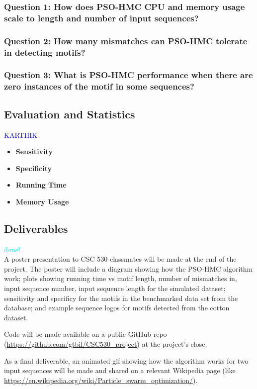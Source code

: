 \documentclass{article}
\begin{document}
\subsubsection{Question 1: How does PSO-HMC CPU and memory usage scale to length and number of input sequences?}

\subsubsection{Question 2: How many mismatches can PSO-HMC tolerate in detecting motifs?}
\subsubsection{Question 3: What is PSO-HMC performance when there are zero instances of the motif in some sequences?}
\subsection{Evaluation and Statistics}
\textcolor{blue}{KARTHIK} \\
\begin{itemize}
	\item \textbf{Sensitivity}
	\item \textbf{Specificity}
	\item \textbf{Running Time}
	\item \textbf{Memory Usage}
\end{itemize}
\subsection{Deliverables}
\textcolor{cyan}{done!} \\
A poster presentation to CSC 530 classmates will be made at the end of the project. The poster will include a diagram showing how the PSO-HMC algorithm work; plots showing running time vs motif length, number of mismatches in, input sequence number, input sequence length for the simulated dataset; sensitivity and specificy for the motifs in the benchmarked data set from the database; and example sequence logos for motifs detected from the cotton dataset.  
  
  Code will be made available on a public GitHub repo (\url{https://github.com/gtbil/CSC530_project}) at the project's close.  
  
  As a final deliverable, an animated gif showing how the algorithm works for two input sequences will be made and shared on a relevant Wikipedia page (like \url{https://en.wikipedia.org/wiki/Particle_swarm_optimization/}).
\end{document}

